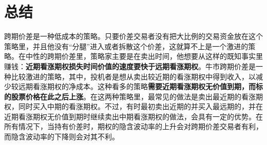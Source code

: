 \documentclass{article}
\begin{document}
\section{总结}
跨期价差是一种低成本的策略。只要价差交易者没有把大比例的交易资金放在这个策略里，并且他没有“分腿”进入或者拆散这个价差，这就算不上是一个激进的策略。在中性的跨期价差里，策略家主要是在卖出时间，他想要从这样的既知事实里赚钱：\textbf{近期看涨期权损失时间价值的速度要快于远期看涨期权}。牛市跨期价差是一种比较激进的策略，其中，投机者是想从卖出较近期的看涨期权中得到收入，以减少较远期看涨期权的净成本。这种看多的策略\textbf{需要近期看涨期权无价值到期，而标的股票价格在此之后上涨}。在这两种策略里，最常见的做法是卖出最近期的看涨期权，同时买入中期的看涨期权。不过，有时最初卖出近期的并买入最远期的，并在近期看涨期权无价值到期时继续卖出中期看涨期权的做法，会具有一定的优势。在所有情况下，当持有价差时，期权的隐含波动率的上升会对跨期价差交易者有利，而隐含波动率的下降则会对其不利。
\end{document}
